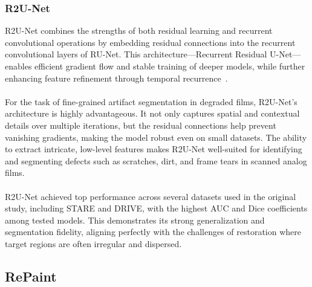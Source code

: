 \documentclass[openany, 12pt]{article}
\begin{document}
\subsubsection*{R2U-Net} R2U-Net combines the strengths of both residual learning and recurrent convolutional operations by embedding residual connections into the recurrent convolutional layers of RU-Net. This architecture—Recurrent Residual U-Net—enables efficient gradient flow and stable training of deeper models, while further enhancing feature refinement through temporal recurrence~\cite{alom_recurrent_2018}.\\
\\
For the task of fine-grained artifact segmentation in degraded films, R2U-Net's architecture is highly advantageous. It not only captures spatial and contextual details over multiple iterations, but the residual connections help prevent vanishing gradients, making the model robust even on small datasets. The ability to extract intricate, low-level features makes R2U-Net well-suited for identifying and segmenting defects such as scratches, dirt, and frame tears in scanned analog films.\\
\\
R2U-Net achieved top performance across several datasets used in the original study, including STARE and DRIVE, with the highest AUC and Dice coefficients among tested models. This demonstrates its strong generalization and segmentation fidelity, aligning perfectly with the challenges of restoration where target regions are often irregular and dispersed.
	\subsection{RePaint}
	
\end{document}
